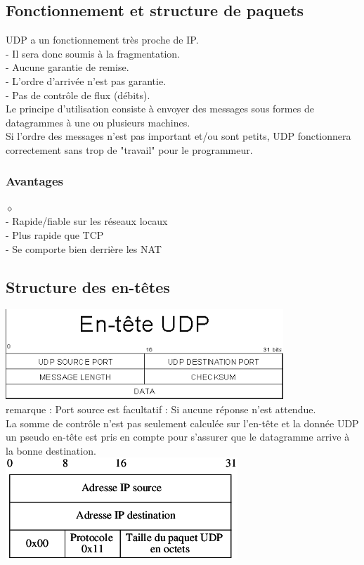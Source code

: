 \documentclass{article}
\begin{document}
\subsection{Fonctionnement et structure de paquets}
UDP a un fonctionnement très proche de IP. \\
- Il sera donc soumis à la fragmentation. \\
- Aucune garantie de remise. \\
- L'ordre d'arrivée n'est pas garantie. \\
- Pas de contrôle de flux (débits).
\\
Le principe d'utilisation consiste à envoyer des messages sous formes de datagrammes à une ou plusieurs machines. \\
Si l'ordre des messages n'est pas important et/ou sont petits, UDP fonctionnera correctement sans trop de "travail" pour le programmeur. \\
\subsubsection*{Avantages} 
$\diamond$\\
- Rapide/fiable sur les réseaux locaux \\
- Plus rapide que TCP \\
- Se comporte bien derrière les NAT \\
\subsection{Structure des en-têtes}
\includegraphics{udp.png}\\
remarque : Port source est facultatif : Si aucune réponse n'est attendue. \\
La somme de contrôle n'est pas seulement calculée sur l'en-tête et la donnée UDP un pseudo en-tête est pris en compte pour s'assurer que le datagramme arrive à la bonne destination. \\
\includegraphics{udp2.png}
\newpage
\end{document}

